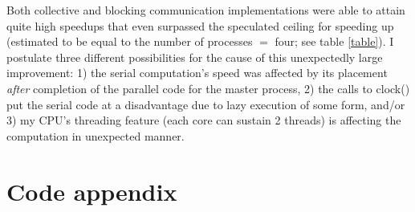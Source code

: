 \documentclass[12pt]{report}
\begin{document}
Both collective and blocking communication implementations were able to attain quite high speedups that even surpassed the speculated ceiling for speeding up (estimated to be equal to the number of processes $=$ four; see table \ref{table}). I postulate three different possibilities for the cause of this unexpectedly large improvement: 1) the serial computation's speed was affected by its placement \emph{after} completion of the parallel code for the master process, 2) the calls to clock() put the serial code at a disadvantage due to lazy execution of some form, and/or 3) my CPU's threading feature (each core can sustain 2 threads) is affecting the computation in unexpected manner. 

\appendix
\chapter*{Code appendix}





\end{document}
